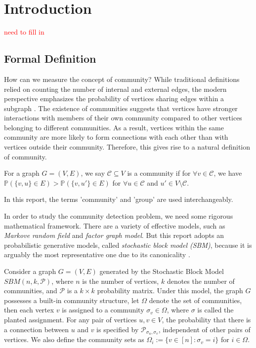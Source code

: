 \chapter{Introduction}
\textcolor{red}{need to fill in}
\section{Formal Definition}
How can we measure the concept of community?  While traditional definitions relied on counting the number of internal and external edges, the modern perspective emphasizes the probability of vertices sharing edges within a subgraph \cite{userguide}. The existence of communities suggests that vertices have stronger interactions with members of their own community compared to other vertices belonging to different communities. As a result, vertices within the same community are more likely to form connections with each other than with vertices outside their community. Therefore, this gives rise to a natural definition of community.
\begin{definition}[Community]
   For a graph $G=(V,E)$, we say $\mathcal{C}\subseteq V$ is a community if for $\forall v\in \mathcal{C}$, we have $\mathbb{P}\left(\{v,u\}\in E\right)>\mathbb{P}\left(\{v,u'\}\in E\right)$ for $\forall u\in \mathcal{C}$ and $u'\in V\setminus \mathcal{C}$.
\end{definition}
\begin{remark}
    In this report, the terms 'community' and 'group' are used interchangeably.
\end{remark}
In order to study the community detection problem, we need some rigorous mathematical framework. There are a variety of effective models, such as \textit{Markove random field} and \textit{factor graph model}. But this report adopts an probabilistic generative models, called \textit{stochastic block model (SBM)}, because it is arguably the most representative one due to its canonicality \cite{Emmanuel2023} \cite{deeplearning}.
\begin{definition}
Consider a graph $G=(V, E)$ generated by the Stochastic Block Model $SBM(n, k, \mathcal{P})$, where $n$ is the number of vertices, $k$ denotes the number of communities, and $\mathcal{P}$ is a $k\times k$ probability matrix. Under this model, the graph $G$ possesses a built-in community structure, let $\Omega$ denote the set of communities, then each vertex $v$ is assigned to a community $\sigma_v\in\Omega$, where $\sigma$ is called the planted assignment. For any pair of vertices $u, v \in V$, the probability that there is a connection between $u$ and $v$ is specified by $\mathcal{P}_{\sigma_u, \sigma_v}$, independent of other pairs of vertices. We also define the community sets as $\Omega_i:=\{v\in[n]: \sigma_v=i\}$ for $i\in\Omega$.
\end{definition}
